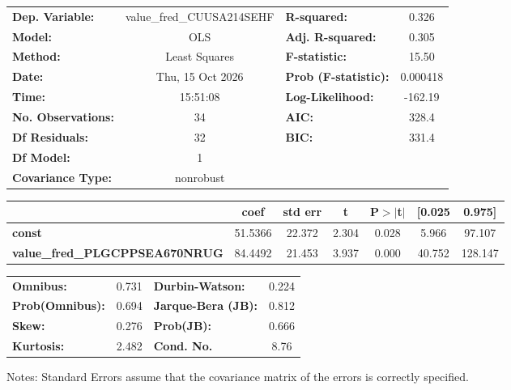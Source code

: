 \begin{center}
\begin{tabular}{lclc}
\toprule
\textbf{Dep. Variable:}                & value\_fred\_CUUSA214SEHF & \textbf{  R-squared:         } &     0.326   \\
\textbf{Model:}                        &            OLS            & \textbf{  Adj. R-squared:    } &     0.305   \\
\textbf{Method:}                       &       Least Squares       & \textbf{  F-statistic:       } &     15.50   \\
\textbf{Date:}                         &      Thu, 15 Oct 2026     & \textbf{  Prob (F-statistic):} &  0.000418   \\
\textbf{Time:}                         &          15:51:08         & \textbf{  Log-Likelihood:    } &   -162.19   \\
\textbf{No. Observations:}             &               34          & \textbf{  AIC:               } &     328.4   \\
\textbf{Df Residuals:}                 &               32          & \textbf{  BIC:               } &     331.4   \\
\textbf{Df Model:}                     &                1          & \textbf{                     } &             \\
\textbf{Covariance Type:}              &         nonrobust         & \textbf{                     } &             \\
\bottomrule
\end{tabular}
\begin{tabular}{lcccccc}
                                       & \textbf{coef} & \textbf{std err} & \textbf{t} & \textbf{P$> |$t$|$} & \textbf{[0.025} & \textbf{0.975]}  \\
\midrule
\textbf{const}                         &      51.5366  &       22.372     &     2.304  &         0.028        &        5.966    &       97.107     \\
\textbf{value\_fred\_PLGCPPSEA670NRUG} &      84.4492  &       21.453     &     3.937  &         0.000        &       40.752    &      128.147     \\
\bottomrule
\end{tabular}
\begin{tabular}{lclc}
\textbf{Omnibus:}       &  0.731 & \textbf{  Durbin-Watson:     } &    0.224  \\
\textbf{Prob(Omnibus):} &  0.694 & \textbf{  Jarque-Bera (JB):  } &    0.812  \\
\textbf{Skew:}          &  0.276 & \textbf{  Prob(JB):          } &    0.666  \\
\textbf{Kurtosis:}      &  2.482 & \textbf{  Cond. No.          } &     8.76  \\
\bottomrule
\end{tabular}
\end{center}

Notes: \newline
 [1] Standard Errors assume that the covariance matrix of the errors is correctly specified.